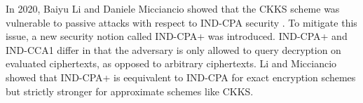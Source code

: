 In 2020, Baiyu Li and Daniele Micciancio showed that the CKKS scheme was vulnerable to passive attacks with respect to IND-CPA security \cite{CKKS-attack}. To mitigate this issue, a new security notion called IND-CPA+ was introduced. IND-CPA+ and IND-CCA1 differ in that the adversary is only allowed to query decryption on evaluated ciphertexts, as opposed to arbitrary ciphertexts. Li and Micciancio showed that IND-CPA+ is eequivalent to IND-CPA for exact encryption schemes but strictly stronger for approximate schemes like CKKS. 
